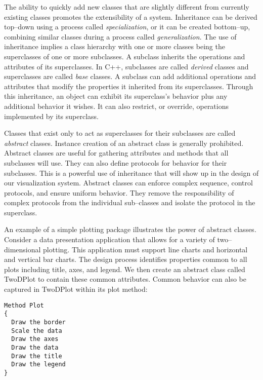 The ability to quickly add new classes that are slightly different from currently existing classes promotes the extensibility of a system. Inheritance can be derived top--down using a process called \emph{specialization}, or it can be created bottom--up, combining similar classes during a process called \emph{generalization}. The use of inheritance implies a class hierarchy with one or more classes being the superclasses of one or more subclasses. A subclass inherits the operations and attributes of its superclasses. In C++, subclasses are called \emph{derived} classes and superclasses are called \emph{base} classes. A subclass can add additional operations and attributes that modify the properties it inherited from its superclasses. Through this inheritance, an object can exhibit its superclass's behavior plus any additional behavior it wishes. It can also restrict, or override, operations implemented by its superclass.

Classes that exist only to act as superclasses for their subclasses are called \emph{abstract} classes. Instance creation of an abstract class is generally prohibited. Abstract classes are useful for gathering attributes and methods that all subclasses will use. They can also define protocols for behavior for their subclasses. This is a powerful use of inheritance that will show up in the design of our visualization system. Abstract classes can enforce complex sequence, control protocols, and ensure uniform behavior. They remove the responsibility of complex protocols from the individual sub--classes and isolate the protocol in the superclass.

An example of a simple plotting package illustrates the power of abstract classes. Consider a data presentation application that allows for a variety of two--dimensional plotting. This application must support line charts and horizontal and vertical bar charts. The design process identifies properties common to all plots including title, axes, and legend. We then create an abstract class called TwoDPlot to contain these common attributes. Common behavior can also be captured in TwoDPlot within its plot method:

\begin{lstlisting}[caption={TwoDPlot.}]
Method Plot
{
  Draw the border
  Scale the data
  Draw the axes
  Draw the data
  Draw the title
  Draw the legend
}
\end{lstlisting}

